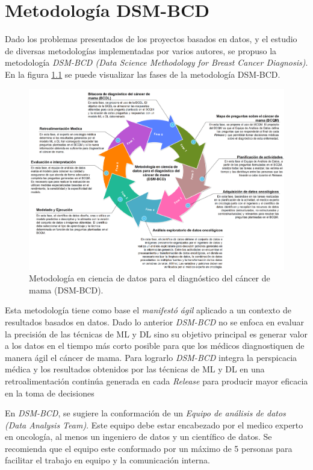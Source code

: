 \chapter{Metodología DSM-BCD}

Dado los problemas presentados de los proyectos basados en datos, y el estudio de diversas metodologías implementadas por varios autores, se propuso la metodología \textit{DSM-BCD (Data Science Methodology for Breast Cancer Diagnosis)}. En la figura \ref{DSM-BCD} se puede visualizar las fases de la metodología DSM-BCD.

\begin{figure}[!htb]
	\centering
	\includegraphics[width=0.9
	\linewidth]{IMAGENES/DSM-BCD_SPANISH.pdf}
	\caption{Metodología en ciencia de datos para el diagnóstico del cáncer de mama 
		(DSM-BCD)\cite{DSMBCD023}.}
	\label{DSM-BCD}
\end{figure}

Esta metodología tiene como base el \textit{manifestó ágil} aplicado a un contexto de resultados basados en datos. Dado lo anterior \textit{DSM-BCD} no se enfoca en evaluar la precisión de las técnicas de ML y DL sino su objetivo principal es generar valor a los datos en el tiempo más corto posible para que los médicos diagnostiquen de manera ágil el cáncer de mama. Para lograrlo \textit{DSM-BCD} integra la perspicacia médica y los resultados obtenidos por las técnicas de ML y DL en una retroalimentación continúa generada en cada \textit{Release} para producir mayor eficacia en la toma de decisiones

En \textit{DSM-BCD}, se sugiere la conformación de un \textit{Equipo de análisis de datos (Data Analysis Team)}. Este equipo debe estar encabezado por el medico experto en oncología, al menos un ingeniero de datos y un científico de datos. Se recomienda que el equipo este conformado por un máximo de 5 personas para facilitar el trabajo en equipo y la comunicación interna.

